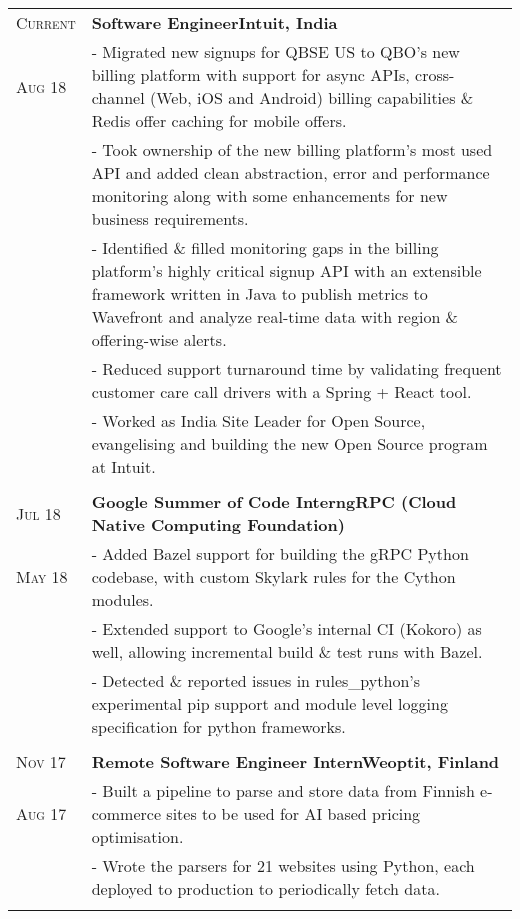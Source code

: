 \documentclass[a4paper,10pt]{extarticle} %
\begin{document}
\begin{tabularx}{\linewidth}{ l | X }

\textsc{Current} & \textbf{Software Engineer}\hfill\textbf{Intuit, India}\\
\textsc{Aug 18} & {- Migrated new signups for QBSE US to QBO's new billing platform with support for async APIs, cross-channel (Web, iOS and Android) billing capabilities \& Redis offer caching for mobile offers.}\\
& {- Took ownership of the new billing platform's most used API and added clean abstraction, error and performance monitoring along with some enhancements for new business requirements.}\\
& {- Identified \& filled monitoring gaps in the billing platform's highly critical signup API with an extensible framework written in Java to publish metrics to Wavefront and analyze real-time data with region \& offering-wise alerts.}\\
& {- Reduced support turnaround time by validating frequent customer care call drivers with a Spring + React tool.}\\
& {- Worked as India Site Leader for Open Source, evangelising and building the new Open Source program at Intuit.}\\
\multicolumn{2}{c}{} \\

\textsc{Jul 18} & \textbf{Google Summer of Code Intern}\hfill\textbf{gRPC (Cloud Native Computing Foundation)}\\
\textsc{May 18}& {- Added Bazel support for building the gRPC Python codebase, with custom Skylark rules for the Cython modules.}\\
& {- Extended support to Google's internal CI (Kokoro) as well, allowing incremental build \& test runs with Bazel.}\\
& {- Detected \& reported issues in rules\_python's experimental pip support and module level logging specification for python frameworks.}\\
\multicolumn{2}{c}{} \\

\textsc{Nov 17} & \textbf{Remote Software Engineer Intern}\hfill\textbf{Weoptit, Finland}\\
\textsc{Aug 17}& {- Built a pipeline to parse and store data from Finnish e-commerce sites to be used for AI based pricing optimisation.}\\
& {- Wrote the parsers for 21 websites using Python, each deployed to production to periodically fetch data.}\\
\multicolumn{2}{c}{} \\


\end{tabularx}
\end{document}

